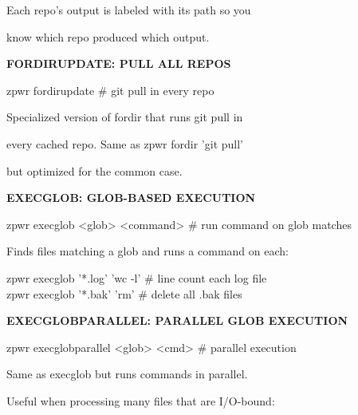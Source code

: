 \documentclass[11pt,a4paper,twoside]{book}
\begin{document}
Each repo's output is labeled with its path so you

know which repo produced which output.


\vspace{12pt}
{\bfseries\color{neonyellow} FORDIRUPDATE: PULL ALL REPOS}\vspace{4pt}

\begin{codebox}
zpwr fordirupdate                   \# git pull in every repo\\
\end{codebox}

Specialized version of fordir that runs git pull in

\begin{codebox}
every cached repo. Same as zpwr fordir 'git pull'\\
\end{codebox}

but optimized for the common case.


\vspace{12pt}
{\bfseries\color{neonyellow} EXECGLOB: GLOB-BASED EXECUTION}\vspace{4pt}

\begin{codebox}
zpwr execglob <glob> <command>      \# run command on glob matches\\
\end{codebox}

Finds files matching a glob and runs a command on each:

\begin{codebox}
zpwr execglob '*.log' 'wc -l'      \# line count each log file\\
zpwr execglob '*.bak' 'rm'         \# delete all .bak files\\
\end{codebox}


\vspace{12pt}
{\bfseries\color{neonyellow} EXECGLOBPARALLEL: PARALLEL GLOB EXECUTION}\vspace{4pt}

\begin{codebox}
zpwr execglobparallel <glob> <cmd>  \# parallel execution\\
\end{codebox}

Same as execglob but runs commands in parallel.

Useful when processing many files that are I/O-bound:
\end{document}
